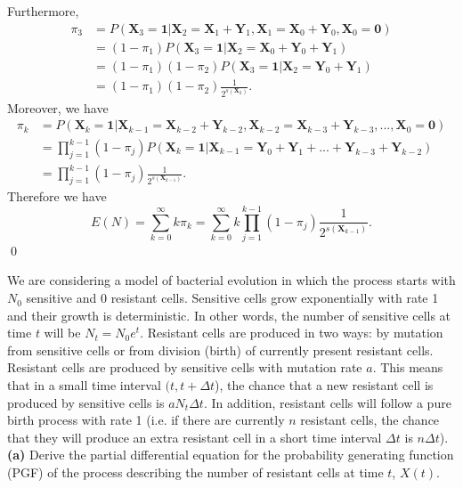 \documentclass[10pt]{amsart}
\begin{document}
\noindent
Furthermore, 
\begin{align*}
\pi_3 &= P(\bm X_3 = \bm 1| \bm X_2 = \bm X_1 + \bm Y_1, \bm X_1 = \bm X_0 + \bm Y_0, \bm X_0 = \bm 0) \\
	&= (1 - \pi_1)P(\bm X_3 = \bm 1| \bm X_2 = \bm X_0 + \bm Y_0 + \bm Y_1) \\
	&= (1 - \pi_1)(1 - \pi_2)P(\bm X_3 = \bm 1| \bm X_2 = \bm Y_0 + \bm Y_1) \\
	&= (1 - \pi_1)(1 - \pi_2)\frac 1 {2^{s(\bm X_2)}}.
\end{align*}
Moreover, we have
\begin{align*}
\pi_k &= P(\bm X_k = \bm 1 | \bm X_{k - 1} = \bm X_{k - 2} + \bm Y_{k - 2}, \bm X_{k - 2} = \bm X_{k - 3} + \bm Y_{k - 3}, ..., \bm X_0 = \bm 0 ) \\
	&= \prod_{j=1}^{k-1} (1 - \pi_j) P(\bm X_k = \bm 1 | \bm X_{k - 1} = \bm Y_0 + \bm Y_1 + ... + \bm Y_{k - 3} + \bm Y_{k - 2}) \\
	&= \prod_{j=1}^{k-1} (1 - \pi_j) \frac 1 {2^{s(\bm X_{k-1})}}.
\end{align*}
Therefore we have
$$
E (N) = \sum_{k=0}^\infty k \pi_k = \sum_{k=0}^\infty k \prod_{j=1}^{k-1} (1 - \pi_j) \frac 1 {2^{s(\bm X_{k-1})}}.
$$
\qed \\
\newpage


 We are considering a model of bacterial evolution in which the process starts with $N_0$ sensitive and 0 resistant cells. Sensitive cells grow exponentially with rate 1 and their growth is deterministic. In other words, the number of sensitive cells at time $t$ will be $N_t=N_0 e^t$. Resistant cells are produced in two ways:  by mutation from sensitive cells or from division (birth) of currently present resistant cells. Resistant cells are produced by sensitive cells with mutation rate $a$. This means that in a small time interval $(t,t+\Delta t$), the chance that a new resistant cell is produced by sensitive cells is $a N_t \Delta t$. In addition, resistant cells will follow a pure birth process with rate 1 (i.e. if there are currently $n$ resistant cells, the chance that they will produce an extra resistant cell in a short time interval $\Delta t$ is $n\Delta t$). 
\\

\noindent
{\bf (a)} Derive the partial differential equation for the probability generating function (PGF) of the process describing the number of resistant cells at time $t$, $X(t)$.\\
\end{document}
